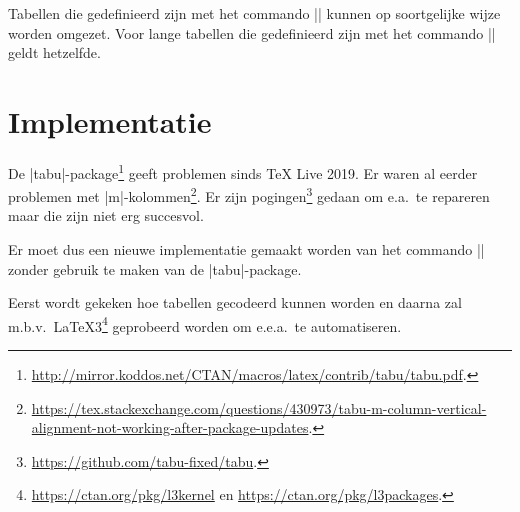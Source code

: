 \begin{llstShortInline}
	
	Tabellen die gedefinieerd zijn met het commando |\tabelmaxpaginabreedgeschaald| kunnen op soortgelijke wijze worden omgezet.
	Voor lange tabellen die gedefinieerd zijn met het commando |\langetabel| geldt hetzelfde. 
	
	\section{Implementatie}
	De |tabu|-package\footnote{%
		\url{http://mirror.koddos.net/CTAN/macros/latex/contrib/tabu/tabu.pdf}.
	} geeft problemen sinds TeX Live 2019. 
	Er waren al eerder problemen met |m|-kolommen\footnote{%
		\url{https://tex.stackexchange.com/questions/430973/tabu-m-column-vertical-alignment-not-working-after-package-updates}.
	}.
	Er zijn pogingen\footnote{%
		\url{https://github.com/tabu-fixed/tabu}.
	} gedaan om e.a.\ te repareren maar die zijn niet erg succesvol.
	
	Er moet dus een nieuwe implementatie gemaakt worden van het commando |\tabel| zonder gebruik te maken van de |tabu|-package.
	
	Eerst wordt gekeken hoe tabellen gecodeerd kunnen worden en daarna zal m.b.v.\ \LaTeX3\footnote{%
		\url{https://ctan.org/pkg/l3kernel} en \url{https://ctan.org/pkg/l3packages}.	
	} geprobeerd worden om e.e.a.\ te automatiseren.
	

\end{llstShortInline}
